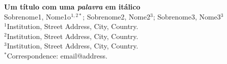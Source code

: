 
\flushleft \textbf{Um título com uma \textit{palavra} em itálico}\\ %


Sobrenome1, Nome1o$^{1,2*}$; %
Sobrenome2, Nome2$^{3}$; %
Sobrenome3, Nome3$^{3}$\\ %


$^{1}$Institution, Street Address, City, Country.\\
$^{2}$Institution, Street Address, City, Country.\\
$^{3}$Institution, Street Address, City, Country.\\
$^{*}$Correspondence: email@address.



